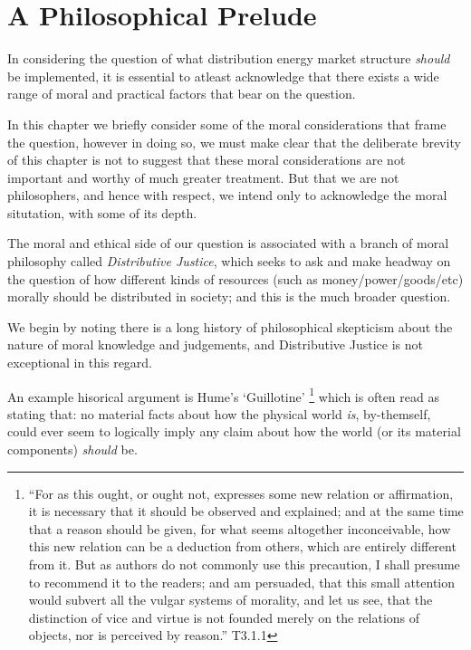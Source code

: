 \section{A Philosophical Prelude}\label{sec:philosophy}


In considering the question of what distribution energy market structure \textit{should} be implemented, it is essential to atleast acknowledge that there exists a wide range of moral and practical factors that bear on the question.

In this chapter we briefly consider some of the moral considerations that frame the question, however in doing so, we must make clear that the deliberate brevity of this chapter is not to suggest that these moral considerations are not important and worthy of much greater treatment. But that we are not philosophers, and hence with respect, we intend only to acknowledge the moral situtation, with some of its depth.


The moral and ethical side of our question is associated with a branch of moral philosophy called \textit{Distributive Justice}, which seeks to ask and make headway on the question of how different kinds of resources (such as money/power/goods/etc) morally should be distributed in society; and this is the much broader question.

We begin by noting there is a long history of philosophical skepticism about the nature of moral knowledge and judgements, and Distributive Justice is not exceptional in this regard.

An example hisorical argument is Hume's `Guillotine' \cite{HumeGutenberg}\footnote{``For as this ought, or ought not, expresses some new relation or affirmation, it is necessary that it should be observed and explained; and at the same time that a reason should be given, for what seems altogether inconceivable, how this new relation can be a deduction from others, which are entirely different from it. But as authors do not commonly use this precaution, I shall presume to recommend it to the readers; and am persuaded, that this small attention would subvert all the vulgar systems of morality, and let us see, that the distinction of vice and virtue is not founded merely on the relations of objects, nor is perceived by reason.'' T3.1.1} which is often read as stating that: no material facts about how the physical world \textit{is}, by-themself, could ever seem to logically imply any claim about how the world (or its material components) \textit{should} be.

